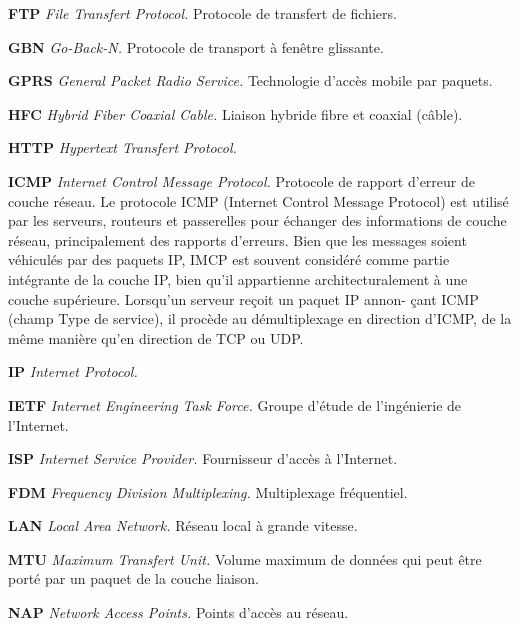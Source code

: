 \textbf{FTP} \textit{File Transfert Protocol.} Protocole de transfert de fichiers.



\textbf{GBN} \textit{Go-Back-N.} Protocole de transport à fenêtre glissante.



\textbf{GPRS} \textit{General Packet Radio Service.} Technologie d’accès mobile par paquets.



\textbf{HFC} \textit{Hybrid Fiber Coaxial Cable.} Liaison hybride fibre et coaxial (câble).



\textbf{HTTP} \textit{Hypertext Transfert Protocol.}



\textbf{ICMP} \textit{Internet Control Message Protocol.} Protocole de rapport d’erreur de couche réseau.
Le protocole ICMP (Internet Control Message Protocol) est utilisé par les serveurs,
routeurs et passerelles pour échanger des informations de couche réseau, principalement
des rapports d’erreurs. Bien que les messages soient véhiculés par des paquets IP, IMCP
est souvent considéré comme partie intégrante de la couche IP, bien qu’il appartienne architecturalement
à une couche supérieure. Lorsqu’un serveur reçoit un paquet IP annon-
çant ICMP (champ Type de service), il procède au démultiplexage en direction d’ICMP,
de la même manière qu’en direction de TCP ou UDP.



\textbf{IP} \textit{Internet Protocol.}



\textbf{IETF} \textit{Internet Engineering Task Force.} Groupe d’étude de l’ingénierie de l’Internet.



\textbf{ISP} \textit{Internet Service Provider.} Fournisseur d’accès à l’Internet.



\textbf{FDM} \textit{Frequency Division Multiplexing.} Multiplexage fréquentiel.



\textbf{LAN} \textit{Local Area Network.} Réseau local à grande vitesse.



\textbf{MTU} \textit{Maximum Transfert Unit.} Volume maximum de données qui peut être porté par un paquet de la couche liaison.



\textbf{NAP} \textit{Network Access Points.} Points d’accès au réseau.



